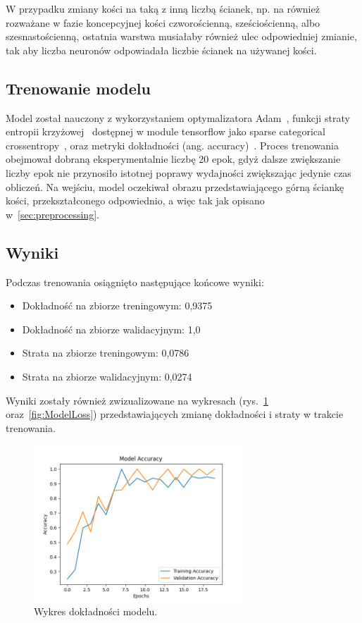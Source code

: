 W przypadku zmiany kości na taką z inną liczbą ścianek, np.
na również rozważane w fazie koncepcyjnej kości czworościenną, sześciościenną, albo szesnastościenną,
ostatnia warstwa musiałaby również ulec odpowiedniej zmianie,
tak aby liczba neuronów odpowiadała liczbie ścianek na używanej kości.

\subsection{Trenowanie modelu}\label{subsec:trenowanie-modelu}

Model został nauczony z wykorzystaniem optymalizatora Adam~\cite{kingma2014adam, keras_adam},
funkcji straty entropii krzyżowej~\cite{crossentropy} dostępnej w module tensorflow jako sparse categorical crossentropy~\cite{tensorflow_loss},
oraz metryki dokładności (ang. accuracy)~\cite{tensorflow_accuracy}.
Proces trenowania obejmował dobraną eksperymentalnie liczbę 20 epok, gdyż dalsze zwiększanie liczby epok nie przynosiło istotnej poprawy wydajności zwiększając jedynie czas obliczeń.
Na wejściu, model oczekiwał obrazu przedstawiającego górną ściankę kości, przekształconego odpowiednio, a więc tak jak opisano w~\ref{sec:preprocessing}.


\subsection{Wyniki}\label{subsec:wyniki}

Podczas trenowania osiągnięto następujące końcowe wyniki:

\begin{itemize}
    \item Dokładność na zbiorze treningowym: 0,9375
    \item Dokładność na zbiorze walidacyjnym: 1,0
    \item Strata na zbiorze treningowym: 0,0786
    \item Strata na zbiorze walidacyjnym: 0,0274
\end{itemize}

Wyniki zostały również zwizualizowane na wykresach (rys.~\ref{fig:ModelAcc} oraz~\ref{fig:ModelLoss})
przedstawiających zmianę dokładności i straty w trakcie trenowania.

\begin{figure}[H]
    \centering
    \includegraphics[width=0.7\textwidth]{chapters/04-czytanie/figures/ModelAcc1}
    \caption{Wykres dokładności modelu.}
    \label{fig:ModelAcc}
\end{figure}

